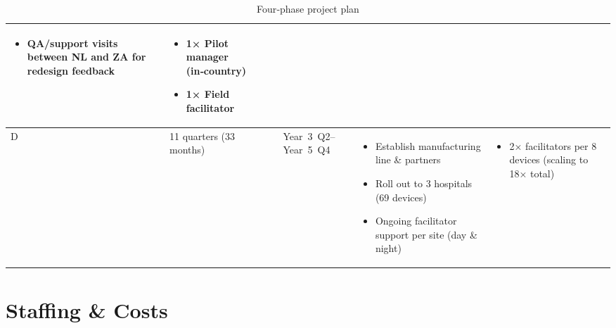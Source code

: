 \documentclass[a4paper,11pt]{article}
\begin{document}
\begin{table}[!htbp]
{\begin{tabular}{|l|l|l|p{5cm}|p{4cm}|}
\begin{itemize}
  \item QA/support visits between NL and ZA for redesign feedback  
\end{itemize}
& 
\begin{itemize}\setlength\itemsep{0pt}
  \item 1× Pilot manager (in‑country)  
  \item 1× Field facilitator  
\end{itemize}
\\
\hline
D & 11 quarters (33 months) & Year 3 Q2–Year 5 Q4 & 
\begin{itemize}\setlength\itemsep{0pt}
  \item Establish manufacturing line \& partners  
  \item Roll out to 3 hospitals (69 devices)  
  \item Ongoing facilitator support per site (day \& night)  
\end{itemize}
& 
\begin{itemize}\setlength\itemsep{0pt}
  \item 2× facilitators per 8 devices (scaling to 18× total)  
\end{itemize}
\\
\hline
\end{tabular}%
}
\caption{Four‑phase project plan}
\label{tab:project-plan}
\end{table}

\newpage

\section{Staffing \& Costs}
\end{document}
